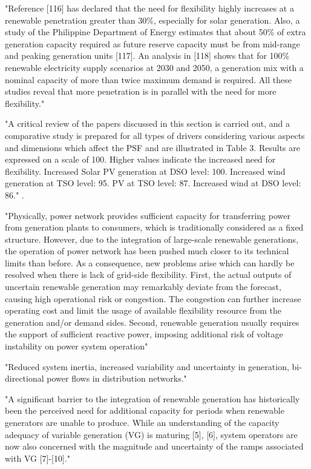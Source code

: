 "Reference [116] has declared that the need for flexibility highly increases at a renewable penetration greater than 30\%, especially for solar generation. Also, a study of the Philippine Department of Energy estimates that about 50\% of extra generation capacity required as future reserve capacity must be from mid-range and peaking generation units [117]. An analysis in [118] shows that for 100\% renewable electricity supply scenarios at 2030 and 2050, a generation mix with a nominal capacity of more than twice maximum demand is required. All these studies reveal that more penetration is in parallel with the need for more flexibility." \cite{alireza_akrami_power_2019} 


"A critical review of the papers discussed in this section is carried out, and a comparative study is prepared for all types of drivers considering various aspects and dimensions which affect the PSF and are illustrated in Table 3. Results are expressed on a scale of 100. Higher values indicate the increased need for flexibility. Increased Solar PV generation at DSO level: 100. Increased wind generation at TSO level: 95. PV at TSO level: 87. Increased wind at DSO level: 86." \cite{kaushik_comprehensive_2022}.


"Physically, power network provides sufficient capacity for transferring power from generation plants to consumers, which is traditionally considered as a fixed structure. However, due to the integration of large-scale renewable generations, the operation of power network has been pushed much closer to its technical limits than before. As a consequence, new problems arise which can hardly be resolved when there is lack of grid-side flexibility. First, the actual outputs of uncertain renewable generation may remarkably deviate from the forecast, causing high operational risk or congestion. The congestion can further increase operating cost and limit the usage of available flexibility resource from the generation and/or demand sides. Second, renewable generation usually requires the support of sufficient reactive power, imposing additional risk of voltage instability on power system operation" \cite{li_grid-side_2018}

"Reduced system inertia, increased variability and uncertainty in generation, bi-directional power flows in distribution networks." \cite{emil_hillberg_flexibility_2019}

"A significant barrier to the integration of renewable generation has historically been the perceived need for additional capacity for periods when renewable generators are unable to produce. While an understanding of the capacity adequacy of variable generation (VG) is maturing [5], [6], system operators are now also concerned with the magnitude and uncertainty of the ramps associated with VG [7]-[10]." \cite{eamonn_lannoye_assessing_2015}

